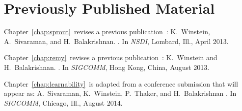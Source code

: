\chapter*{Previously Published Material}
%

{
\setlength{\parindent}{0 pt}
\setlength{\parskip}{\baselineskip}

Chapter~\ref{chap:sprout}~revises a previous
publication~\cite{sprout}:
K.~Winstein, A.~Sivaraman, and H.~Balakrishnan.
.
\newblock In {\em NSDI}, Lombard, Ill., April 2013.

Chapter~\ref{chap:remy}~revises a previous publication~\cite{remy}:
K.~Winstein and H.~Balakrishnan.
.
\newblock In {\em SIGCOMM}, Hong Kong, China, August 2013.

Chapter~\ref{chap:learnability}~is adapted from a conference
submission that will appear as:
A.~Sivaraman, K.~Winstein, P.~Thaker, and H.~Balakrishnan
. \newblock In {\em
  SIGCOMM}, Chicago, Ill., August 2014.

}
